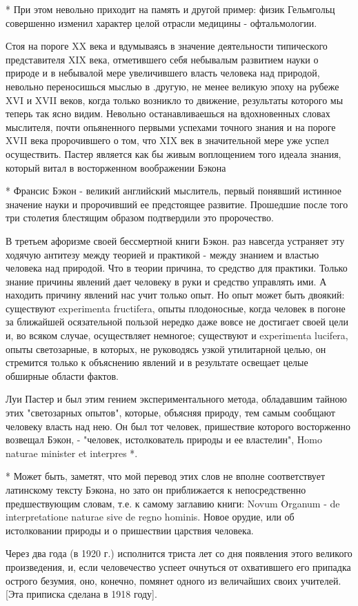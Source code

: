 * При этом невольно приходит на память и другой пример: физик
Гельмгольц совершенно изменил характер целой отрасли медицины -
офтальмологии.

Стоя на пороге XX века и вдумываясь в значение деятельности  типического
представителя XIX  века, отметившего  себя небывалым  развитием науки  о
природе и в  небывалой мере увеличившего  власть человека над  природой,
невольно переносишься мыслью в .другую, не менее великую эпоху на рубеже
XVI и XVII веков, когда только возникло то движение, результаты которого
мы теперь  так ясно  видим.  Невольно останавливаешься  на  вдохновенных
словах мыслителя, почти опьяненного первыми успехами точного знания и на
пороге XVII века пророчившего о том, что XIX век в значительной мере уже
успел осуществить. Пастер является как бы живым воплощением того  идеала
знания, который витал в восторженном воображении Бэкона

* Франсис Бэкон - великий английский мыслитель, первый понявший
истинное значение науки и пророчивший ее предстоящее развитие.
Прошедшие после того три столетия блестящим образом подтвердили это
пророчество.

В третьем афоризме своей бессмертной книги Бэкон. раз навсегда устраняет
эту ходячую антитезу между теорией и практикой - между знанием и властью
человека над природой. Что в  теории причина, то средство для  практики.
Только знание причины явлений дает человеку в руки и средство  управлять
ими. А находить причину явлений нас учит только опыт. Но опыт может быть
двоякий: существуют  experimenta  fructifera, опыты  плодоносные,  когда
человек в погоне за ближайшей осязательной пользой нередко даже вовсе не
достигает  своей  цели  и,  во  всяком  случае,  осуществляет  немногое;
существуют и  experimenta lucifera,  опыты  светозарные, в  которых,  не
руководясь узкой  утилитарной целью,  он стремится  только к  объяснению
явлений и в результате освещает целые обширные области фактов.

Луи Пастер  и  был  этим гением  экспериментального  метода,  обладавшим
тайною этих "светозарных опытов",  которые, объясняя природу, тем  самым
сообщают человеку  власть  над  нею.  Он  был  тот  человек,  пришествие
которого восторженно возвещал Бэкон, - "человек, истолкователь природы и
ее властелин", Homo naturae minister et interpres *.

* Может быть, заметят, что мой перевод этих слов не вполне
соответствует латинскому тексту Бэкона, но зато он приближается к
непосредственно предшествующим словам, т.е. к самому заглавию книги:
Novum Organum - de interpretatione naturae sive de regno hominis.
Новое орудие, или об истолковании природы и о пришествии царствия
человека.

Через два  года (в  1920 г.)  исполнится триста  лет со  дня появления
этого великого  произведения, и, если человечество  успеет очнуться от
охватившего его припадка острого безумия, оно, конечно, помянет одного
из величайших своих учителей. [Эта приписка сделана в 1918 году].
